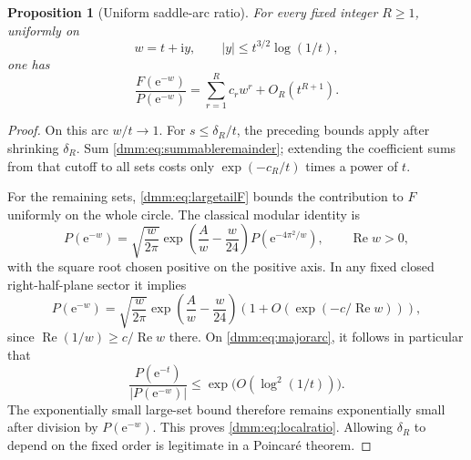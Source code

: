 \documentclass[11pt,letterpaper]{article}
\numberwithin{equation}{section}
\newtheorem{proposition}[theorem]{Proposition}
\theoremstyle{definition}\newtheorem{definition}[theorem]{Definition}
\theoremstyle{remark}\newtheorem{remark}[theorem]{Remark}
\newcommand{\ii}{\mathrm i}
\newcommand{\ee}{\mathrm e}
\DeclareMathOperator{\Rea}{Re}
\begin{document}
\begin{proposition}[Uniform saddle-arc ratio]\label{dmm:prop:localratio}
For every fixed integer $R\ge1$, uniformly on
\begin{equation}\label{dmm:eq:majorarc}
w=t+\ii y,\qquad |y|\le t^{3/2}\log(1/t),
\end{equation}
one has
\begin{equation}\label{dmm:eq:localratio}
\frac{F(\ee^{-w})}{P(\ee^{-w})}
=\sum_{r=1}^{R}c_rw^r+O_R(t^{R+1}).
\end{equation}
\end{proposition}
\begin{proof}
On this arc $w/t\to1$. For $s\le\delta_R/t$, the preceding bounds apply after shrinking $\delta_R$. Sum \eqref{dmm:eq:summableremainder}; extending the coefficient sums from that cutoff to all sets costs only $\exp(-c_R/t)$ times a power of $t$.

For the remaining sets, \eqref{dmm:eq:largetailF} bounds the contribution to $F$ uniformly on the whole circle. The classical modular identity \cite[eq.~(1.3)]{grabner} is
\begin{equation}\label{dmm:eq:modular}
P(\ee^{-w})=\sqrt{\frac w{2\pi}}
\exp\left(\frac Aw-\frac w{24}\right)
P(\ee^{-4\pi^2/w}),
\qquad \Rea w>0,
\end{equation}
with the square root chosen positive on the positive axis. In any fixed closed right-half-plane sector it implies
\begin{equation}\label{dmm:eq:modularapprox}
P(\ee^{-w})=\sqrt{\frac w{2\pi}}
\exp\left(\frac Aw-\frac w{24}\right)
\left(1+O(\exp(-c/\Rea w))\right),
\end{equation}
since $\Rea(1/w)\ge c/\Rea w$ there. On \eqref{dmm:eq:majorarc}, it follows in particular that
\[
\frac{P(\ee^{-t})}{|P(\ee^{-w})|}
\le\exp\bigl(O(\log^2(1/t))\bigr).
\]
The exponentially small large-set bound therefore remains exponentially small after division by $P(\ee^{-w})$. This proves \eqref{dmm:eq:localratio}. Allowing $\delta_R$ to depend on the fixed order is legitimate in a Poincar\'e theorem.
\end{proof}
\end{document}
